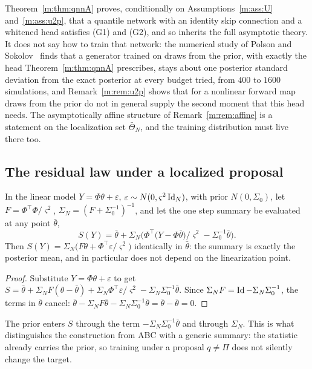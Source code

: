 Theorem~\ref{m:thm:qnnA} proves, conditionally on Assumptions~\ref{m:ass:U} and~\ref{m:ass:u2p}, that a quantile network with an identity skip connection and a whitened head satisfies (G1) and (G2), and so inherits the full asymptotic theory. It does not say how to train that network: the numerical study of Polson and Sokolov~\cite{polsonsokolov2026} finds that a generator trained on draws from the prior, with exactly the head Theorem~\ref{m:thm:qnnA} prescribes, stays about one posterior standard deviation from the exact posterior at every budget tried, from $400$ to $1600$ simulations, and Remark~\ref{m:rem:u2p} shows that for a nonlinear forward map draws from the prior do not in general supply the second moment that this head needs. The asymptotically affine structure of Remark~\ref{m:rem:affine} is a statement on the localization set $\bar\Theta_N$, and the training distribution must live there too.

\subsection{The residual law under a localized proposal}

\begin{lemma}\label{m:lem:exact}
In the linear model $Y=\Phi\theta+\varepsilon$, $\varepsilon\sim N(0,\varsigma^2\operatorname{Id}_N)$, with prior $N(0,\Sigma_0)$, let $F=\Phi^\top\Phi/\varsigma^2$, $\Sigma_N=(F+\Sigma_0^{-1})^{-1}$, and let the one step summary be evaluated at any point $\bar\theta$,
\[
S(Y)=\bar\theta+\Sigma_N\Big(\Phi^\top\big(Y-\Phi\bar\theta\big)/\varsigma^2-\Sigma_0^{-1}\bar\theta\Big).
\]
Then $S(Y)=\Sigma_N\big(F\theta+\Phi^\top\varepsilon/\varsigma^2\big)$ identically in $\bar\theta$: the summary is exactly the posterior mean, and in particular does not depend on the linearization point.
\end{lemma}

\begin{proof}
Substitute $Y=\Phi\theta+\varepsilon$ to get $S=\bar\theta+\Sigma_NF(\theta-\bar\theta)+\Sigma_N\Phi^\top\varepsilon/\varsigma^2-\Sigma_N\Sigma_0^{-1}\bar\theta$. Since $\Sigma_NF=\operatorname{Id}-\Sigma_N\Sigma_0^{-1}$, the terms in $\bar\theta$ cancel: $\bar\theta-\Sigma_NF\bar\theta-\Sigma_N\Sigma_0^{-1}\bar\theta=\bar\theta-\bar\theta=0$.
\end{proof}

The prior enters $S$ through the term $-\Sigma_N\Sigma_0^{-1}\bar\theta$ and through $\Sigma_N$. This is what distinguishes the construction from ABC with a generic summary: the statistic already carries the prior, so training under a proposal $q\ne\Pi$ does not silently change the target.

